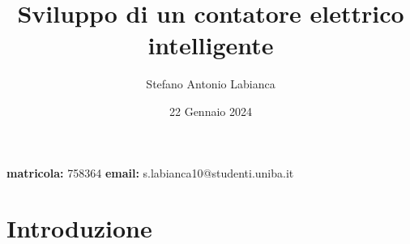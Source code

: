 \documentclass[12pt, letterpaper]{article}
\title{\textbf{Sviluppo di un contatore elettrico intelligente}}
\author{Stefano Antonio Labianca}
\date{22 Gennaio 2024}
\begin{document}
\maketitle


\textbf{matricola: } 758364
\hfill
\textbf{email: } s.labianca10@studenti.uniba.it


\tableofcontents

\section{Introduzione}





\end{document}
